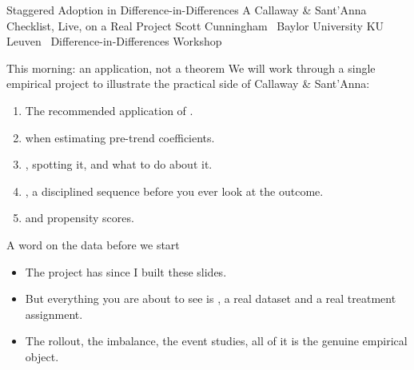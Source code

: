 \documentclass[aspectratio=169,11pt]{beamer}
\begin{document}

\codechellatitle
  {Staggered Adoption in Difference-in-Differences}
  {A Callaway \& Sant'Anna Checklist, Live, on a Real Project}
  {Scott Cunningham \textperiodcentered\ Baylor University}
  {KU Leuven \textperiodcentered\ Difference-in-Differences Workshop}


\begin{frame}{This morning: an application, not a theorem}
\vspace{0.4em}
We will work through a single empirical project to illustrate the practical side of Callaway \& Sant'Anna:
\vspace{0.5em}
\begin{enumerate}\setlength\itemsep{0.5em}
  \item[(a)] The recommended application of .
  \item[(b)]  when estimating pre-trend coefficients.
  \item[(c)] , spotting it, and what to do about it.
  \item[(d)] , a disciplined sequence before you ever look at the outcome.
  \item[(e)]  and propensity scores.
\end{enumerate}
\vspace{0.6em}
\end{frame}

\begin{frame}{A word on the data before we start}
\vspace{0.8em}
\begin{itemize}\setlength\itemsep{0.7em}
  \item The project has  since I built these slides.
  \item But everything you are about to see is , a real dataset and a real treatment assignment.
  \item {} The rollout, the imbalance, the event studies, all of it is the genuine empirical object.
\end{itemize}
\end{frame}
\end{document}
